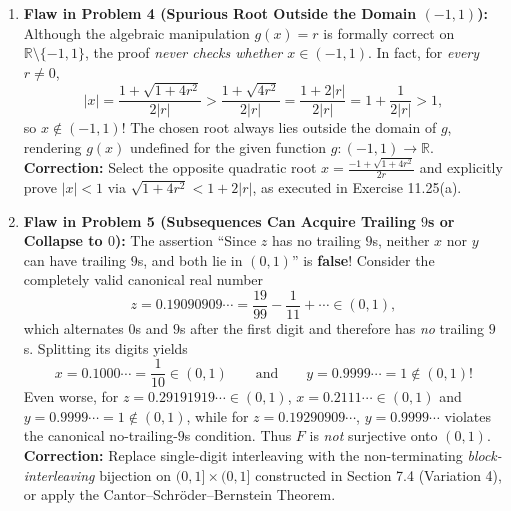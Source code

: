\documentclass[11pt, letterpaper]{article}
\theoremstyle{definition}
\theoremstyle{remark}
\begin{document}
\begin{enumerate}
    \item \textbf{Flaw in Problem 4 (Spurious Root Outside the Domain $(-1, 1)$):}
    Although the algebraic manipulation $g(x) = r$ is formally correct on $\mathbb{R} \setminus \{-1, 1\}$, the proof \emph{never checks whether $x \in (-1, 1)$}. In fact, for \emph{every} $r \neq 0$,
    \[
    |x| = \frac{1 + \sqrt{1 + 4r^2}}{2|r|} > \frac{1 + \sqrt{4r^2}}{2|r|} = \frac{1 + 2|r|}{2|r|} = 1 + \frac{1}{2|r|} > 1,
    \]
    so $x \notin (-1, 1)$! The chosen root always lies outside the domain of $g$, rendering $g(x)$ undefined for the given function $g : (-1, 1) \to \mathbb{R}$.
    \textbf{Correction:} Select the opposite quadratic root $x = \frac{-1 + \sqrt{1 + 4r^2}}{2r}$ and explicitly prove $|x| < 1$ via $\sqrt{1 + 4r^2} < 1 + 2|r|$, as executed in Exercise 11.25(a).

    \item \textbf{Flaw in Problem 5 (Subsequences Can Acquire Trailing $9$s or Collapse to $0$):}
    The assertion ``Since $z$ has no trailing $9$s, neither $x$ nor $y$ can have trailing $9$s, and both lie in $(0, 1)$'' is \textbf{false}! Consider the completely valid canonical real number
    \[
    z = 0.19090909\cdots = \frac{19}{99} - \frac{1}{11} + \cdots \in (0, 1),
    \]
    which alternates $0$s and $9$s after the first digit and therefore has \emph{no} trailing $9$s. Splitting its digits yields
    \[
    x = 0.1000\cdots = \frac{1}{10} \in (0, 1) \qquad \text{and} \qquad y = 0.9999\cdots = 1 \notin (0, 1)!
    \]
    Even worse, for $z = 0.29191919\cdots \in (0, 1)$, $x = 0.2111\cdots \in (0, 1)$ and $y = 0.9999\cdots = 1 \notin (0, 1)$, while for $z = 0.19290909\cdots$, $y = 0.9999\cdots$ violates the canonical no-trailing-$9$s condition. Thus $F$ is \emph{not} surjective onto $(0, 1)$.
    \textbf{Correction:} Replace single-digit interleaving with the non-terminating \emph{block-interleaving} bijection on $(0, 1] \times (0, 1]$ constructed in Section 7.4 (Variation 4), or apply the Cantor–Schr\"oder–Bernstein Theorem.
\end{enumerate}
\end{document}

